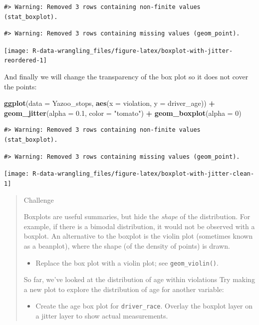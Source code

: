 \documentclass[]{book}
\newenvironment{Shaded}{\begin{snugshade}}{\end{snugshade}}
\newcommand{\DataTypeTok}[1]{\textcolor[rgb]{0.13,0.29,0.53}{#1}}
\newcommand{\DecValTok}[1]{\textcolor[rgb]{0.00,0.00,0.81}{#1}}
\newcommand{\FloatTok}[1]{\textcolor[rgb]{0.00,0.00,0.81}{#1}}
\newcommand{\KeywordTok}[1]{\textcolor[rgb]{0.13,0.29,0.53}{\textbf{#1}}}
\newcommand{\NormalTok}[1]{#1}
\newcommand{\OperatorTok}[1]{\textcolor[rgb]{0.81,0.36,0.00}{\textbf{#1}}}
\newcommand{\StringTok}[1]{\textcolor[rgb]{0.31,0.60,0.02}{#1}}
\providecommand{\tightlist}{%
  \setlength{\itemsep}{0pt}\setlength{\parskip}{0pt}}
\begin{document}
\begin{verbatim}
#> Warning: Removed 3 rows containing non-finite values (stat_boxplot).
\end{verbatim}

\begin{verbatim}
#> Warning: Removed 3 rows containing missing values (geom_point).
\end{verbatim}

\texttt{[image: R-data-wrangling\_files/figure-latex/boxplot-with-jitter-reordered-1]}

And finally we will change the transparency of the box plot so it does not cover the points:

\begin{Shaded}
\begin{Highlighting}[]
\KeywordTok{ggplot}\NormalTok{(}\DataTypeTok{data =}\NormalTok{ Yazoo_stops, }\KeywordTok{aes}\NormalTok{(}\DataTypeTok{x =}\NormalTok{ violation, }\DataTypeTok{y =}\NormalTok{ driver_age)) }\OperatorTok{+}
\StringTok{    }\KeywordTok{geom_jitter}\NormalTok{(}\DataTypeTok{alpha =} \FloatTok{0.1}\NormalTok{, }\DataTypeTok{color =} \StringTok{"tomato"}\NormalTok{) }\OperatorTok{+}
\StringTok{    }\KeywordTok{geom_boxplot}\NormalTok{(}\DataTypeTok{alpha =} \DecValTok{0}\NormalTok{)  }
\end{Highlighting}
\end{Shaded}

\begin{verbatim}
#> Warning: Removed 3 rows containing non-finite values (stat_boxplot).
\end{verbatim}

\begin{verbatim}
#> Warning: Removed 3 rows containing missing values (geom_point).
\end{verbatim}

\texttt{[image: R-data-wrangling\_files/figure-latex/boxplot-with-jitter-clean-1]}

\begin{quote}
Challenge

Boxplots are useful summaries, but hide the \emph{shape} of the distribution. For
example, if there is a bimodal distribution, it would not be observed with a
boxplot. An alternative to the boxplot is the violin plot (sometimes known as a
beanplot), where the shape (of the density of points) is drawn.

\begin{itemize}
\tightlist
\item
  Replace the box plot with a violin plot; see \texttt{geom\_violin()}.
\end{itemize}

So far, we've looked at the distribution of age within violations Try making a
new plot to explore the distribution of age for another variable:

\begin{itemize}
\tightlist
\item
  Create the age box plot for \texttt{driver\_race}. Overlay the boxplot layer on a jitter layer to show actual measurements.
\end{itemize}
\end{quote}
\end{document}
